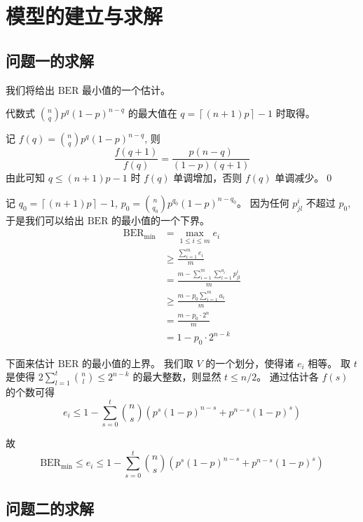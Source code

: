 \section{模型的建立与求解}

\subsection{问题一的求解}

我们将给出 \(\mathrm{BER}\) 最小值的一个估计。

\noindent{} 代数式 \(\binom{n}{q}p^q(1-p)^{n-q}\) 的最大值在 \(q=\left\lceil\left(n+1\right)p\right\rceil-1\) 时取得。

\noindent{} 记 \(f\left(q\right)=\binom{n}{q}p^q\left(1-p\right)^{n-q}\), 则
\[\frac{f\left(q+1\right)}{f\left(q\right)}=\frac{p\left(n-q\right)}{\left(1-p\right)\left(q+1\right)}\]
由此可知 \(q\le\left(n+1\right)p-1\) 时 \(f\left(q\right)\) 单调增加，否则 \(f\left(q\right)\) 单调减少。\qed

记 \(q_0=\left\lceil\left(n+1\right)p\right\rceil-1\), \(p_0=\binom{n}{q_0}p^{q_0}(1-p)^{n-q_0}\)。
因为任何 \(p^i_{jl}\) 不超过 \(p_0\), 于是我们可以给出 \(\mathrm{BER}\) 的最小值的一个下界。
\begin{align*}
  \mathrm{BER}_\mathrm{min}&=\max_{1\le i\le m}e_i\\
  &\ge\frac{\sum_{i=1}^m e_i}{m}\\
  &=\frac{m-\sum_{i=1}^m\sum_{l=1}^{a_i}p^i_{jl}}{m}\\
  &\ge\frac{m-p_0\sum_{i=1}^m a_i}{m}\\
  &=\frac{m-p_0\cdot2^n}{m}\\
  &=1-p_0\cdot 2^{n-k}
\end{align*}

下面来估计 \(\mathrm{BER}\) 的最小值的上界。
我们取 \(V\) 的一个划分，使得诸 \(e_i\) 相等。
取 \(t\) 是使得 \(2\sum_{l=1}^t\binom{n}{l}\le 2^{n-k}\) 的最大整数，则显然 \(t\le n/2\)。
通过估计各 \(f\left(s\right)\) 的个数可得
\[e_i\le 1-\sum_{s=0}^t\binom{n}{s}\left(p^s\left(1-p\right)^{n-s}+p^{n-s}\left(1-p\right)^s\right)\]

故
\[\mathrm{BER}_\mathrm{min}\le e_i\le 1-\sum_{s=0}^t\binom{n}{s}\left(p^s\left(1-p\right)^{n-s}+p^{n-s}\left(1-p\right)^s\right)\]

\subsection{问题二的求解}

